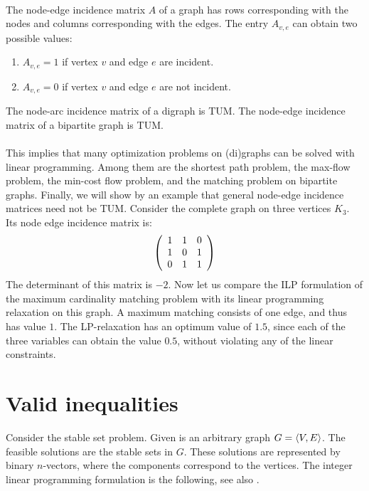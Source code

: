 {\paragraph{}
The node-edge incidence matrix $A$ of a graph has rows corresponding with the nodes and columns corresponding with the edges. The entry $A_{v,e}$ can obtain two possible values:
\begin{enumerate}
 \item $A_{v,e}=1$ if vertex $v$ and edge $e$ are incident.
 \item $A_{v,e}=0$ if vertex $v$ and edge $e$ are not incident.
\end{enumerate}

\begin{corollary}
The node-arc incidence matrix of a digraph is TUM. The node-edge incidence matrix of a bipartite graph is TUM.
\end{corollary}

\paragraph{}
This implies that many optimization problems on (di)graphs can be solved with linear programming. Among them are the shortest path problem, the max-flow problem, the min-cost flow problem, and the matching problem on bipartite graphs. Finally, we will show by an example that general node-edge incidence matrices need not be TUM. Consider the complete graph on three vertices $K_3$. Its node edge
incidence matrix is:
\begin{equation}
\left( \begin{array}{ccc}
1&1&0\\
1&0&1\\
0&1&1
\end{array} \right)
\end{equation}
The determinant of this matrix is $-2$. Now let us compare the ILP formulation of the maximum cardinality matching problem with its linear programming relaxation on this graph. A maximum matching consists of one edge, and thus has value $1$. The LP-relaxation has an optimum value of $1.5$, since each of the three variables can obtain the value $0.5$, without violating any of the linear constraints.

\section{Valid inequalities}
Consider the stable set problem. Given is an arbitrary graph $G=\left\langle V,E \right\rangle$. The feasible solutions are the stable sets in $G$. These solutions are represented by binary $n$-vectors, where the components correspond to the vertices. The integer linear programming formulation is the following, see also .

}
